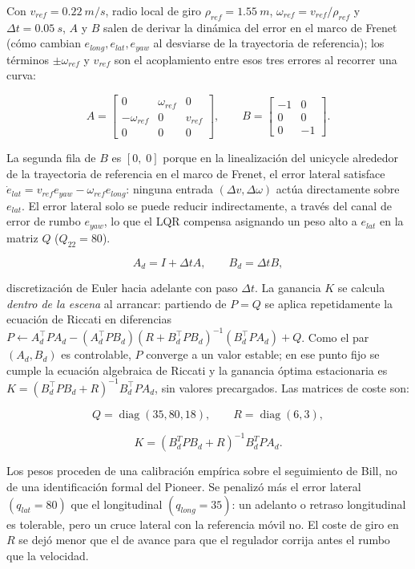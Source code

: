 Con \(v_{ref}=\SI{0.22}{m/s}\), radio local de giro \(\rho_{ref}=\SI{1.55}{m}\),
\(\omega_{ref}=v_{ref}/\rho_{ref}\) y
\(\Delta t=\SI{0.05}{s}\), \(A\) y \(B\) salen de derivar la dinámica del error
en el marco de Frenet (cómo cambian \(e_{long},e_{lat},e_{yaw}\) al desviarse de
la trayectoria de referencia); los términos \(\pm\omega_{ref}\) y \(v_{ref}\) son
el acoplamiento entre esos tres errores al recorrer una curva:

\[
A=
\begin{bmatrix}
0 & \omega_{ref} & 0\\
-\omega_{ref} & 0 & v_{ref}\\
0 & 0 & 0
\end{bmatrix},
\qquad
B=
\begin{bmatrix}
-1 & 0\\
0 & 0\\
0 & -1
\end{bmatrix}.
\]

La segunda fila de \(B\) es \([0,\;0]\) porque en la linealización del unicycle
alrededor de la trayectoria de referencia en el marco de Frenet, el error
lateral satisface \(\dot{e}_{lat}=v_{ref}e_{yaw}-\omega_{ref}e_{long}\):
ninguna entrada \((\Delta v,\Delta\omega)\) actúa directamente sobre \(e_{lat}\).
El error lateral solo se puede reducir indirectamente, a través del canal
de error de rumbo \(e_{yaw}\), lo que el LQR compensa asignando un peso alto
a \(e_{lat}\) en la matriz \(Q\) (\(Q_{22}=80\)).

\[
A_d=I+\Delta t A,\qquad B_d=\Delta t B,
\]

discretización de Euler hacia adelante con paso \(\Delta t\). La ganancia \(K\) se
calcula \emph{dentro de la escena} al arrancar: partiendo de \(P=Q\) se aplica
repetidamente la ecuación de Riccati en diferencias
\(P\leftarrow A_d^\top P A_d-(A_d^\top P B_d)(R+B_d^\top P B_d)^{-1}(B_d^\top P A_d)+Q\).
Como el par \((A_d,B_d)\) es controlable, \(P\) converge a un valor estable; en
ese punto fijo se cumple la ecuación algebraica de Riccati y la ganancia óptima
estacionaria es \(K=(B_d^\top P B_d+R)^{-1}B_d^\top P A_d\), sin valores
precargados. Las matrices de coste son:

\[
Q=\operatorname{diag}(35,80,18),
\qquad
R=\operatorname{diag}(6,3),
\]

\[
K=(B_d^T P B_d+R)^{-1}B_d^T P A_d.
\]

Los pesos proceden de una calibración empírica sobre el seguimiento de Bill, no
de una identificación formal del Pioneer. Se penalizó más el error lateral
\((q_{lat}=80)\) que el longitudinal \((q_{long}=35)\): un adelanto o retraso
longitudinal es tolerable, pero un cruce lateral con la referencia móvil no. El coste de giro en \(R\) se dejó menor que el de avance
para que el regulador corrija antes el rumbo que la velocidad.

